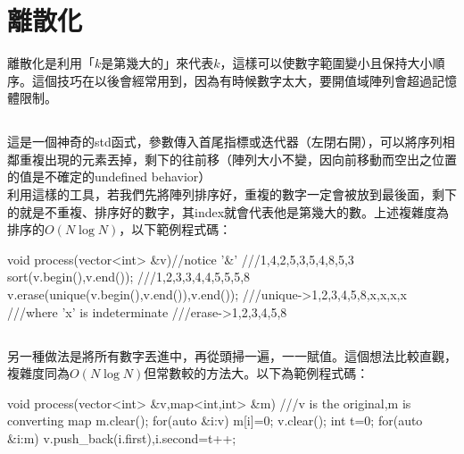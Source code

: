\section{離散化}
離散化是利用「$k$是第幾大的」來代表$k$，這樣可以使數字範圍變小且保持大小順序。這個技巧在以後會經常用到，因為有時候數字太大，要開值域陣列會超過記憶體限制。
\subsection{}
這是一個神奇的std函式，參數傳入首尾指標或迭代器（左閉右開），可以將序列相鄰重複出現的元素丟掉，剩下的往前移（陣列大小不變，因向前移動而空出之位置的值是不確定的undefined behavior）\\
利用這樣的工具，若我們先將陣列排序好，重複的數字一定會被放到最後面，剩下的就是不重複、排序好的數字，其index就會代表他是第幾大的數。上述複雜度為排序的$O(N\log N)$，以下範例程式碼：\\
\begin{C++}
void process(vector<int> &v){//notice '&'
    ///{1,4,2,5,3,5,4,8,5,3}
    sort(v.begin(),v.end());
    ///{1,2,3,3,4,4,5,5,5,8}
    v.erase(unique(v.begin(),v.end()),v.end());
    ///unique->{1,2,3,4,5,8,x,x,x,x}
    ///where 'x' is indeterminate
    ///erase->{1,2,3,4,5,8}
}
\end{C++}
\subsection{}
另一種做法是將所有數字丟進中，再從頭掃一遍，一一賦值。這個想法比較直觀，複雜度同為$O(N\log N)$但常數較的方法大。以下為範例程式碼：\\
\begin{C++}
void process(vector<int> &v,map<int,int> &m){
	  ///v is the original,m is converting map
    m.clear();
    for(auto &i:v) m[i]=0;
    v.clear();
    int t=0;
    for(auto &i:m) v.push_back(i.first),i.second=t++;
}
\end{C++}
